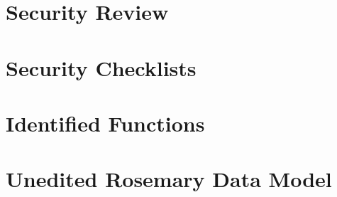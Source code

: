 \documentclass[a4paper]{report}
\begin{document}
	
	
	\chapter{Security Review}
	\label{security-review-appendix}
	
	
	
	
	
	\chapter{Security Checklists}
	\label{security-appendix}
	
	
	
	\chapter{Identified Functions}
	\label{identified-functions}
	
	
	
	\chapter{Unedited Rosemary Data Model}
	\label{unedited-datamodel}
	
	
\end{document}
